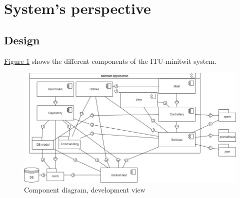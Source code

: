 \section{System's perspective} \label{section:System perspective}
\subsection{Design} %
\hyperref[fig:componentDiagram]{Figure \ref{fig:componentDiagram}} shows the different components of the ITU-minitwit system.

\begin{figure}[H]
    \centering
    \includegraphics[width=1.0\textwidth]{images/Diagrams-Development_view_component_diagram.jpg}
    \caption{Component diagram, development view}
    \label{fig:componentDiagram}
\end{figure}


